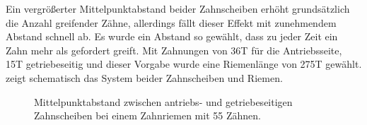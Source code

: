 		Ein vergrößerter Mittelpunktabstand beider Zahnscheiben erhöht grundsätzlich die Anzahl greifender Zähne, allerdings fällt dieser Effekt mit zunehmendem Abstand schnell ab.
		Es wurde ein Abstand so gewählt, dass zu jeder Zeit ein Zahn mehr als gefordert greift.
		Mit Zahnungen von 36T für die Antriebsseite, 15T getriebeseitig und dieser Vorgabe wurde eine Riemenlänge von 275T gewählt.
		 zeigt schematisch das System beider Zahnscheiben und Riemen.
		\begin{figure}[h]
			\centering
			
			\caption[Mittelpunktabstand zwischen antriebs- und getriebeseitigen Zahnscheiben]{Mittelpunktabstand zwischen antriebs- und getriebeseitigen Zahnscheiben bei einem Zahnriemen mit 55 Zähnen.}
			\label{fig:timing belt length}
		\end{figure}
